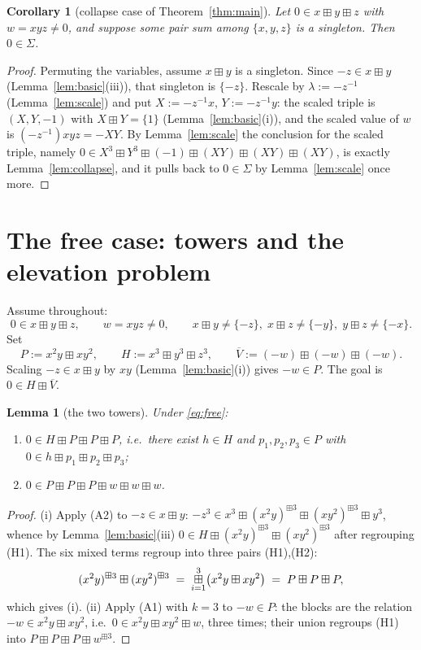 \documentclass[11pt]{article}
\newtheorem{lemma}[theorem]{Lemma}
\newtheorem{corollary}[theorem]{Corollary}
\theoremstyle{definition}
\theoremstyle{remark}
\newcommand{\bp}{\boxplus}
\newcommand{\bigboxplus}{\mathop{\mbox{\normalsize$\boxplus$}}\limits}
\begin{document}
\begin{corollary}[collapse case of Theorem~\ref{thm:main}]\label{cor:collapse}
Let $0\in x\bp y\bp z$ with $w=xyz\neq0$, and suppose some pair sum among
$\{x,y,z\}$ is a singleton. Then $0\in\Sigma$.
\end{corollary}
\begin{proof}
Permuting the variables, assume $x\bp y$ is a singleton. Since
$-z\in x\bp y$ (Lemma~\ref{lem:basic}(iii)), that singleton is $\{-z\}$.
Rescale by $\lambda:=-z^{-1}$ (Lemma~\ref{lem:scale}) and put
$X:=-z^{-1}x$, $Y:=-z^{-1}y$: the scaled triple is $(X,Y,-1)$ with
$X\bp Y=\{1\}$ (Lemma~\ref{lem:basic}(i)), and the scaled value of $w$ is
$(-z^{-1})xyz=-XY$. By Lemma~\ref{lem:scale} the conclusion for the
scaled triple, namely
$0\in X^3\bp Y^3\bp(-1)\bp(XY)\bp(XY)\bp(XY)$, is exactly
Lemma~\ref{lem:collapse}, and it pulls back to $0\in\Sigma$ by
Lemma~\ref{lem:scale} once more.
\end{proof}

\section{The free case: towers and the elevation problem}\label{sec:free}

Assume throughout:
\begin{equation}\label{eq:free}
  0\in x\bp y\bp z,\qquad w=xyz\neq0,\qquad
  x\bp y\neq\{-z\},\;x\bp z\neq\{-y\},\;y\bp z\neq\{-x\}.
  \tag{F}
\end{equation}
Set
\[
  P:=x^2y\bp xy^2,\qquad H:=x^3\bp y^3\bp z^3,\qquad
  \overline V:=(-w)\bp(-w)\bp(-w).
\]
Scaling $-z\in x\bp y$ by $xy$ (Lemma~\ref{lem:basic}(i)) gives
$-w\in P$. The goal is $0\in H\bp\overline V$.

\begin{lemma}[the two towers]\label{lem:towers}
Under \eqref{eq:free}:
\begin{enumerate}[label=\textup{(\roman*)}]
\item $0\in H\bp P\bp P\bp P$, i.e.\ there exist $h\in H$ and
$p_1,p_2,p_3\in P$ with $0\in h\bp p_1\bp p_2\bp p_3$;
\item $0\in P\bp P\bp P\bp w\bp w\bp w$.
\end{enumerate}
\end{lemma}

\begin{proof}
(i) Apply (A2) to $-z\in x\bp y$:
$-z^3\in x^3\bp(x^2y)^{\bp3}\bp(xy^2)^{\bp3}\bp y^3$, whence by
Lemma~\ref{lem:basic}(iii)
$0\in H\bp(x^2y)^{\bp3}\bp(xy^2)^{\bp3}$ after regrouping (H1). The six
mixed terms regroup into three pairs (H1),(H2):
\begin{equation}\label{eq:blockP}
  (x^2y)^{\bp3}\bp(xy^2)^{\bp3}
  \;=\;\bigboxplus_{i=1}^{3}\bigl(x^2y\bp xy^2\bigr)
  \;=\;P\bp P\bp P ,
\end{equation}
which gives (i).
(ii) Apply (A1) with $k=3$ to $-w\in P$: the blocks are the relation
$-w\in x^2y\bp xy^2$, i.e.\ $0\in x^2y\bp xy^2\bp w$, three times; their
union regroups (H1) into $P\bp P\bp P\bp w^{\bp3}$.
\end{proof}
\end{document}
